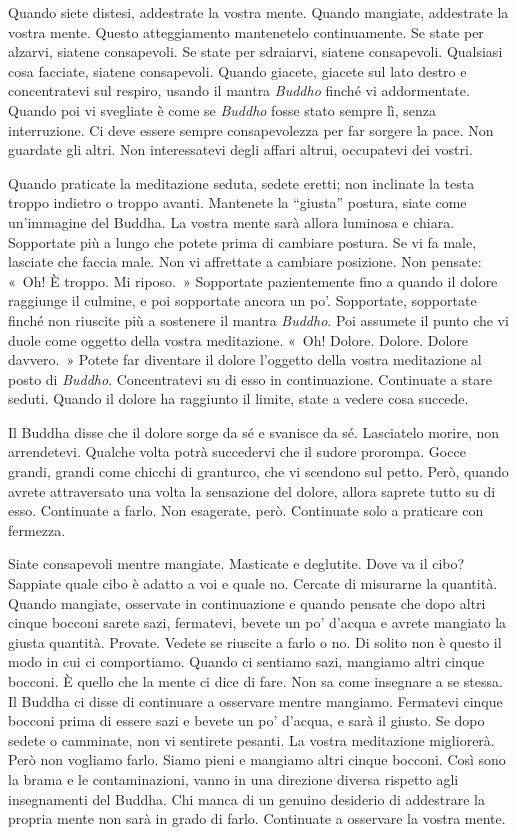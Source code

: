 Quando siete distesi, addestrate la vostra mente. Quando mangiate,
addestrate la vostra mente. Questo atteggiamento mantenetelo
continuamente. Se state per alzarvi, siatene consapevoli. Se state per
sdraiarvi, siatene consapevoli. Qualsiasi cosa facciate, siatene
consapevoli. Quando giacete, giacete sul lato destro e concentratevi sul
respiro, usando il mantra \emph{Buddho} finché vi addormentate. Quando
poi vi svegliate è come se \emph{Buddho} fosse stato sempre lì, senza
interruzione. Ci deve essere sempre consapevolezza per far sorgere la
pace. Non guardate gli altri. Non interessatevi degli affari altrui,
occupatevi dei vostri.

Quando praticate la meditazione seduta, sedete eretti; non inclinate la
testa troppo indietro o troppo avanti. Mantenete la ``giusta'' postura,
siate come un'immagine del Buddha. La vostra mente sarà allora luminosa
e chiara. Sopportate più a lungo che potete prima di cambiare postura.
Se vi fa male, lasciate che faccia male. Non vi affrettate a cambiare
posizione. Non pensate: «~Oh! È troppo. Mi riposo.~» Sopportate
pazientemente fino a quando il dolore raggiunge il culmine, e poi
sopportate ancora un po'. Sopportate, sopportate finché non riuscite più
a sostenere il mantra \emph{Buddho}. Poi assumete il punto che vi duole
come oggetto della vostra meditazione. «~Oh! Dolore. Dolore. Dolore
davvero.~» Potete far diventare il dolore l'oggetto della vostra
meditazione al posto di \emph{Buddho}. Concentratevi su di esso in
continuazione. Continuate a stare seduti. Quando il dolore ha raggiunto
il limite, state a vedere cosa succede.

Il Buddha disse che il dolore sorge da sé e svanisce da sé. Lasciatelo
morire, non arrendetevi. Qualche volta potrà succedervi che il sudore
prorompa. Gocce grandi, grandi come chicchi di granturco, che vi
scendono sul petto. Però, quando avrete attraversato una volta la
sensazione del dolore, allora saprete tutto su di esso. Continuate a
farlo. Non esagerate, però. Continuate solo a praticare con fermezza.

Siate consapevoli mentre mangiate. Masticate e deglutite. Dove va il
cibo? Sappiate quale cibo è adatto a voi e quale no. Cercate di
misurarne la quantità. Quando mangiate, osservate in continuazione e
quando pensate che dopo altri cinque bocconi sarete sazi, fermatevi,
bevete un po' d'acqua e avrete mangiato la giusta quantità. Provate.
Vedete se riuscite a farlo o no. Di solito non è questo il modo in cui
ci comportiamo. Quando ci sentiamo sazi, mangiamo altri cinque bocconi.
È quello che la mente ci dice di fare. Non sa come insegnare a se
stessa. Il Buddha ci disse di continuare a osservare mentre mangiamo.
Fermatevi cinque bocconi prima di essere sazi e bevete un po' d'acqua, e
sarà il giusto. Se dopo sedete o camminate, non vi sentirete pesanti. La
vostra meditazione migliorerà. Però non vogliamo farlo. Siamo pieni e
mangiamo altri cinque bocconi. Così sono la brama e le contaminazioni,
vanno in una direzione diversa rispetto agli insegnamenti del Buddha.
Chi manca di un genuino desiderio di addestrare la propria mente non
sarà in grado di farlo. Continuate a osservare la vostra mente.

